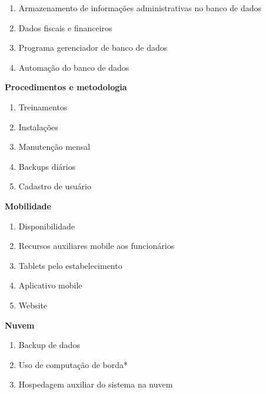 \begin{enumerate}
	\item Armazenamento de informações administrativas no banco de dados
	\item Dados fiscais e financeiros
	\item Programa gerenciador de banco de dados
	\item Automação do banco de dados
\end{enumerate}
\textbf{Procedimentos e metodologia}
\begin{enumerate}
	\item Treinamentos
	\item Instalações
	\item Manutenção mensal
	\item Backups diários
	\item Cadastro de usuário
\end{enumerate}
\textbf{Mobilidade}
\begin{enumerate}
	\item Disponibilidade 
	\item Recursos auxiliares mobile aos funcionários
	\item Tablets pelo estabelecimento
	\item Aplicativo mobile
	\item Website 
\end{enumerate}
\textbf{Nuvem}
\begin{enumerate}
	\item Backup de dados
	\item Uso de computação de borda*
	\item Hospedagem auxiliar do sistema na nuvem
\end{enumerate}

